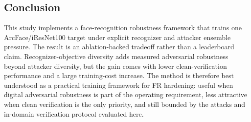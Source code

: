 \documentclass[conference]{IEEEtran}
\begin{document}
\subsection{Conclusion}
This study implements a face-recognition robustness framework that trains one
ArcFace/iResNet100 target under explicit recognizer and attacker ensemble
pressure. The result is an ablation-backed tradeoff rather than a leaderboard
claim. Recognizer-objective diversity adds measured adversarial robustness
beyond attacker diversity, but the gain comes with lower clean-verification
performance and a large training-cost increase. The method is therefore best
understood as a practical training framework for FR hardening: useful when
digital adversarial robustness is part of the operating requirement, less
attractive when clean verification is the only priority, and still bounded by
the attacks and in-domain verification protocol evaluated here.
\end{document}
